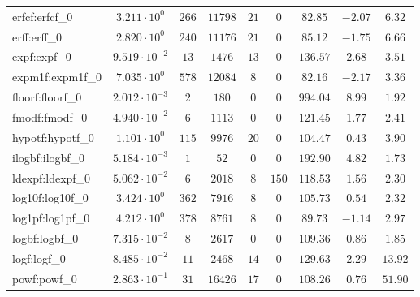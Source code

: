 \begin{tabular}{|l|c|c|c|c|c|c|c|c|}
erfcf:erfcf\_0               & $ 3.211 \cdot 10^{0}  $ & $ 266    $ & $ 11798  $ & $ 21  $ & $ 0    $ & $ 82.85       $ & $ -2.07   $ & $ 6.32    $ \\
erff:erff\_0                 & $ 2.820 \cdot 10^{0}  $ & $ 240    $ & $ 11176  $ & $ 21  $ & $ 0    $ & $ 85.12       $ & $ -1.75   $ & $ 6.66    $ \\
expf:expf\_0                 & $ 9.519 \cdot 10^{-2} $ & $ 13     $ & $ 1476   $ & $ 13  $ & $ 0    $ & $ 136.57      $ & $ 2.68    $ & $ 3.51    $ \\
expm1f:expm1f\_0             & $ 7.035 \cdot 10^{0}  $ & $ 578    $ & $ 12084  $ & $ 8   $ & $ 0    $ & $ 82.16       $ & $ -2.17   $ & $ 3.36    $ \\
floorf:floorf\_0             & $ 2.012 \cdot 10^{-3} $ & $ 2      $ & $ 180    $ & $ 0   $ & $ 0    $ & $ 994.04      $ & $ 8.99    $ & $ 1.92    $ \\
fmodf:fmodf\_0               & $ 4.940 \cdot 10^{-2} $ & $ 6      $ & $ 1113   $ & $ 0   $ & $ 0    $ & $ 121.45      $ & $ 1.77    $ & $ 2.41    $ \\
hypotf:hypotf\_0             & $ 1.101 \cdot 10^{0}  $ & $ 115    $ & $ 9976   $ & $ 20  $ & $ 0    $ & $ 104.47      $ & $ 0.43    $ & $ 3.90    $ \\
ilogbf:ilogbf\_0             & $ 5.184 \cdot 10^{-3} $ & $ 1      $ & $ 52     $ & $ 0   $ & $ 0    $ & $ 192.90      $ & $ 4.82    $ & $ 1.73    $ \\
ldexpf:ldexpf\_0             & $ 5.062 \cdot 10^{-2} $ & $ 6      $ & $ 2018   $ & $ 8   $ & $ 150  $ & $ 118.53      $ & $ 1.56    $ & $ 2.30    $ \\
log10f:log10f\_0             & $ 3.424 \cdot 10^{0}  $ & $ 362    $ & $ 7916   $ & $ 8   $ & $ 0    $ & $ 105.73      $ & $ 0.54    $ & $ 2.32    $ \\
log1pf:log1pf\_0             & $ 4.212 \cdot 10^{0}  $ & $ 378    $ & $ 8761   $ & $ 8   $ & $ 0    $ & $ 89.73       $ & $ -1.14   $ & $ 2.97    $ \\
logbf:logbf\_0               & $ 7.315 \cdot 10^{-2} $ & $ 8      $ & $ 2617   $ & $ 0   $ & $ 0    $ & $ 109.36      $ & $ 0.86    $ & $ 1.85    $ \\
logf:logf\_0                 & $ 8.485 \cdot 10^{-2} $ & $ 11     $ & $ 2468   $ & $ 14  $ & $ 0    $ & $ 129.63      $ & $ 2.29    $ & $ 13.92   $ \\
powf:powf\_0                 & $ 2.863 \cdot 10^{-1} $ & $ 31     $ & $ 16426  $ & $ 17  $ & $ 0    $ & $ 108.26      $ & $ 0.76    $ & $ 51.90   $ \\

\end{tabular}
